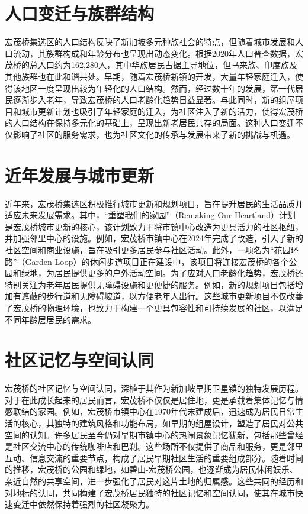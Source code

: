 \documentclass[11pt,a4paper,twoside,openany]{book}
\begin{document}
\section{人口变迁与族群结构}
宏茂桥集选区的人口结构反映了新加坡多元种族社会的特点，但随着城市发展和人口流动，其族群构成和年龄分布也呈现出动态变化。根据2020年人口普查数据，宏茂桥的总人口约为162,280人，其中华族居民占据主导地位，但马来族、印度族及其他族群也在此和谐共处。早期，随着宏茂桥新镇的开发，大量年轻家庭迁入，使得该地区一度呈现出较为年轻化的人口结构。然而，经过数十年的发展，第一代居民逐渐步入老年，导致宏茂桥的人口老龄化趋势日益显著。与此同时，新的组屋项目和城市更新计划也吸引了年轻家庭的迁入，为社区注入了新的活力，使得宏茂桥的人口结构在保持多元化的基础上，呈现出新老居民共存的局面。这种人口变迁不仅影响了社区的服务需求，也为社区文化的传承与发展带来了新的挑战与机遇。

\section{近年发展与城市更新}
近年来，宏茂桥集选区积极推行城市更新和规划项目，旨在提升居民的生活品质并适应未来发展需求。其中，“重塑我们的家园”（Remaking Our Heartland）计划是宏茂桥城市更新的核心，该计划致力于将市镇中心改造为更具活力的社区枢纽，并加强邻里中心的设施。例如，宏茂桥市镇中心在2024年完成了改造，引入了新的社区空间和商业设施，旨在吸引更多居民参与社区活动。此外，一项名为“花园环路”（Garden Loop）的休闲步道项目正在建设中，该项目将连接宏茂桥的各个公园和绿地，为居民提供更多的户外活动空间。为了应对人口老龄化趋势，宏茂桥还特别关注为老年居民提供无障碍设施和更便捷的服务。例如，新的规划项目包括增加有遮蔽的步行道和无障碍坡道，以方便老年人出行。这些城市更新项目不仅改善了宏茂桥的物理环境，也致力于构建一个更具包容性和可持续发展的社区，以满足不同年龄层居民的需求。

\section{社区记忆与空间认同}
宏茂桥的社区记忆与空间认同，深植于其作为新加坡早期卫星镇的独特发展历程。对于在此成长起来的居民而言，宏茂桥不仅仅是居住地，更是承载着集体记忆与情感联结的家园。例如，宏茂桥市镇中心在1970年代末建成后，迅速成为居民日常生活的核心，其独特的建筑风格和功能布局，如早期的组屋设计，塑造了居民对公共空间的认知。许多居民至今仍对早期市镇中心的热闹景象记忆犹新，包括那些曾经是社区交流中心的传统咖啡店和巴刹。这些场所不仅提供了商品和服务，更是邻里互动、信息交流的重要节点，构成了居民早期社区生活的重要组成部分。随着时间的推移，宏茂桥的公园和绿地，如碧山-宏茂桥公园，也逐渐成为居民休闲娱乐、亲近自然的共享空间，进一步强化了居民对这片土地的归属感。这些共同的经历和对地标的认同，共同构建了宏茂桥居民独特的社区记忆和空间认同，使其在城市快速变迁中依然保持着强烈的社区凝聚力。
\end{document}
